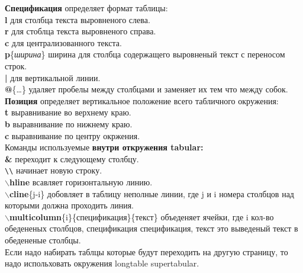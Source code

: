 \documentclass{article}
\newcommand{\bs}{$\backslash$}
\newcommand{\bd}[1]{{\bfseries #1}} %
\newcommand{\bb}[1]{\bd{\bs #1}} %
\begin{document}
\bd{Спецификация} определяет формат таблицы:\\
\bd{l} для столбца текста выровненого слева.\\
\bd{r} для стоблца текста выровненого справа.\\
\bd{c} для централизованного текста.\\
\bd{p}\{\emph{ширина}\} ширина для столбца содержащего выровненый текст
с переносом строк.\\
\bd{|} для вертикальной линии.\\
\bd{@}\{\ldots\} удаляет пробелы между столбцами
и заменяет их тем что между собок.\\

\bd{Позиция} определяет вертикальное положение всего табличного окружения:\\
\bd{t} выравнивание во верхнему краю.\\
\bd{b} выравнивание по нижнему краю.\\
\bd{c} выравнивание по центру окржения.\\

Команды используемые \bd{внутри откружения tabular:}\\
\bd{\&} переходит к следующему столбцу.\\
\verb|\\| начинает новую строку.\\
\bb{hline} всавляет горизонтальную линию.\\
\bb{cline}\{j-i\} добовляет в таблицу неполные линии,
где j и i номера столбцов над которыми должна проходить линия.\\
\bb{multicolumn}\{i\}\{спецификация\}\{текст\} объеденяет ячейки,
где i кол-во обедененых столбцов, спецификация спецификация,
текст это выведеный текст в обедененые столбцы.\\

Если надо набирать таблцы которые будут переходить на другую страницу,
то надо испольховать окружения longtable supertabular.\\ \\
\end{document}
